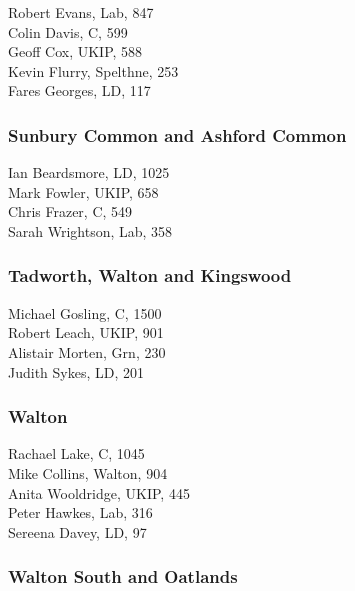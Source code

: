 \documentclass[a4paper,openany,10pt]{book}
\begin{document}


Robert Evans, Lab, 847\\
Colin Davis, C, 599\\
Geoff Cox, UKIP, 588\\
Kevin Flurry, Spelthne, 253\\
Fares Georges, LD, 117\\


\subsubsection*{Sunbury Common and Ashford Common}



Ian Beardsmore, LD, 1025\\
Mark Fowler, UKIP, 658\\
Chris Frazer, C, 549\\
Sarah Wrightson, Lab, 358\\


\subsubsection*{Tadworth, Walton and Kingswood}



Michael Gosling, C, 1500\\
Robert Leach, UKIP, 901\\
Alistair Morten, Grn, 230\\
Judith Sykes, LD, 201\\


\subsubsection*{Walton}



Rachael Lake, C, 1045\\
Mike Collins, Walton, 904\\
Anita Wooldridge, UKIP, 445\\
Peter Hawkes, Lab, 316\\
Sereena Davey, LD, 97\\


\subsubsection*{Walton South and Oatlands}
\end{document}
